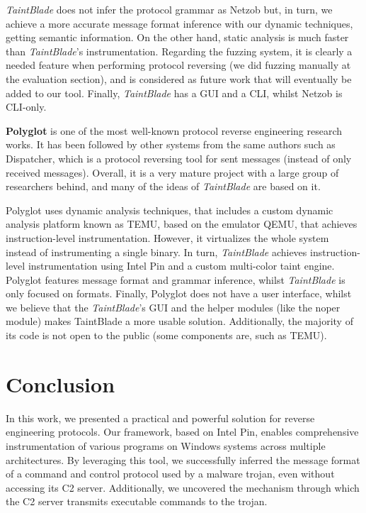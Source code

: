 \documentclass[conference]{IEEEtran}
\begin{document}
\textit{TaintBlade} does not infer the protocol grammar as Netzob but, in turn, we achieve a more accurate message
format inference with our dynamic techniques, getting semantic information. On the other hand, static analysis is
much faster than \textit{TaintBlade}'s instrumentation. Regarding the fuzzing system, it is clearly a needed feature
when performing protocol reversing (we did fuzzing manually at the evaluation section), and is considered as
future work that will eventually be added to our tool. Finally, \textit{TaintBlade} has a GUI and a CLI, whilst Netzob is CLI-only.

\textbf{Polyglot} \cite{polyglot_caballero} is one of the most well-known protocol reverse engineering research works.
It has been followed by other systems from the same authors such as Dispatcher\cite{dispatcher_paper}, which is a
protocol reversing tool for sent messages (instead of only received messages). Overall, it is a very mature project with
a large group of researchers behind, and many of the ideas of \textit{TaintBlade} are based on it.

Polyglot uses dynamic analysis techniques, that includes a custom dynamic
analysis platform known as TEMU, based on the emulator QEMU\cite{qemu}, that
achieves instruction-level instrumentation. However, it virtualizes the whole
system instead of instrumenting a single binary. In turn, \textit{TaintBlade}
achieves instruction-level instrumentation using Intel Pin and a custom
multi-color taint engine. Polyglot features message format and grammar
inference, whilst \textit{TaintBlade} is only focused on formats. Finally,
Polyglot does not have a user interface, whilst we believe that the
\textit{TaintBlade}'s GUI and the helper modules (like the noper module) makes
TaintBlade a more usable solution. Additionally, the majority of its code is
not open to the public (some components are, such as TEMU).

\section{Conclusion}
In this work, we presented a practical and powerful solution for reverse
engineering protocols. Our framework, based on Intel Pin, enables comprehensive
instrumentation of various programs on Windows systems across multiple
architectures. By leveraging this tool, we successfully inferred the message
format of a command and control protocol used by a malware trojan, even without
accessing its C2 server. Additionally, we uncovered the mechanism through which
the C2 server transmits executable commands to the trojan.
\end{document}
